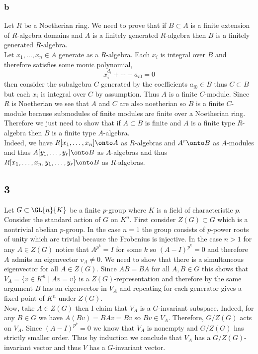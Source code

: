 \documentclass[12pt]{article}
\begin{document}
\subsubsection{b}

Let $R$ be a Noetherian ring. 
We need to prove that if $B \subset A$ is a finite extension of $R$-algebra domains and $A$ is a finitely generated $R$-algebra then $B$ is a finitely generated $R$-algebra.
\bigskip\\
Let $x_1, \dots, x_n \in A$ generate as a $R$-algebra. Each $x_i$ is integral over $B$ and therefore satisfies some monic polynomial,
\[ x_i^{d_i} + \cdots + a_{i0} = 0 \]
then consider the subalgebra $C$ generated by the coefficients $a_{i0} \in B$ thus $C \subset B$ but each $x_i$ is integral over $C$ by assumption. Thus $A$ is a finite $C$-module. Since $R$ is Noetherian we see that $A$ and $C$ are also noetherian so $B$ is a finite $C$-module because submodules of finite modules are finite over a Noetherian ring. Therefore we just need to show that if $A \subset B$ is finite and $A$ is a finite type $R$-algebra then $B$ is a finite type $A$-algebra.
\bigskip\\
Indeed, we have $R[x_1, \dots, x_n] \onto A$ as $R$-algebras and $A^r \onto B$ as $A$-modules and thus $A[y_1, \dots, y_r] \onto B$ as $A$-algebras and thus $R[x_1, \dots, x_n, y_1, \dots, y_r] \onto B$ as $R$-algebras.

\subsection{3}

Let $G \subset \GL{n}{K}$ be a finite $p$-group where $K$ is a field of characteristic $p$. Consider the standard action of $G$ on $K^n$. First consider $Z(G) \subset G$ which is a nontrivial abelian $p$-group. In the case $n = 1$ the group consists of $p$-power roots of unity which are trivial because the Frobenius is injective. In the case $n > 1$ for any $A \in Z(G)$ notice that $A^{p^k} = I$ for some $k$ so $(A - I)^{p^k} = 0$ and therefore $A$ admits an eigenvector $v_A \neq 0$. We need to show that there is a simultaneous eigenvector for all $A \in Z(G)$. Since $AB = BA$ for all $A, B \in G$ this shows that $V_A = \{ v \in K^n \mid Av = v \}$ is a $Z(G)$-representation and therefore by the same argument $B$ has an eigenvector in $V_A$ and repeating for each generator gives a fixed point of $K^n$ under $Z(G)$.
\bigskip\\
Now, take $A \in Z(G)$ then I claim that $V_A$ is a $G$-invariant subspace. Indeed, for any $B \in G$ we have $A (Bv) = BAv = Bv$ so $Bv \in V_A$. Therefore, $G/Z(G)$ acts on $V_A$. Since $(A - I)^{p^k} = 0$ we know that $V_A$ is nonempty and $G/Z(G)$ has strictly smaller order. Thus by induction we conclude that $V_A$ has a $G/Z(G)$-invariant vector and thus $V$ has a $G$-invariant vector.
\end{document}

